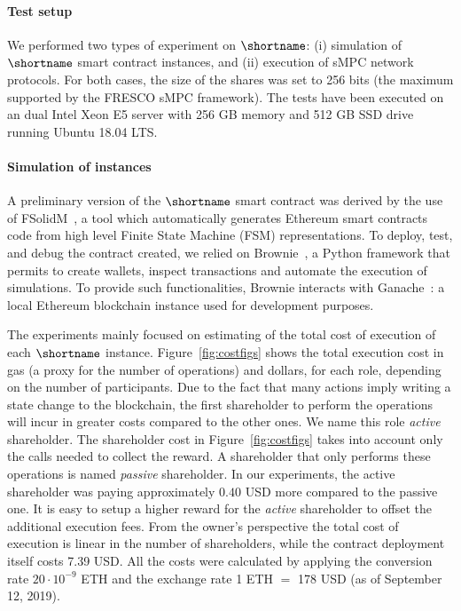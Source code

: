 \paragraph*{Test setup}
We performed two types of experiment on $\shortname$: (i) simulation of $\shortname$ smart contract instances, and (ii) execution of sMPC network protocols. 
For both cases, the size of the shares was set to 256 bits (the maximum supported by the FRESCO sMPC framework).
The tests have been executed on an dual Intel Xeon E5 server with 256 GB memory and 512 GB SSD drive running Ubuntu 18.04 LTS.

\medskip

\paragraph*{Simulation of \shortname instances}
A preliminary version of the $\shortname$ smart contract was derived by the use of FSolidM~\cite{Mavridou2017DesigningSE}, a tool which automatically generates Ethereum smart contracts code from high level Finite State Machine (FSM) representations.
To deploy, test, and debug the contract created, we relied on Brownie~\cite{brownie}, a Python framework that permits to create wallets, inspect transactions and automate the execution of simulations.
To provide such functionalities, Brownie interacts with Ganache~\cite{ganache}: a local Ethereum blockchain instance used for development purposes.

The experiments mainly focused on estimating of the total cost of execution of each $\shortname$ instance. 
Figure~\ref{fig:costfigs} shows the total execution cost in gas (a proxy for the number of operations) and dollars, for each role, depending on the number of participants.
%
Due to the fact that many \shortname actions imply writing a state change to the blockchain, the first shareholder to perform the operations will incur in greater costs compared to the other ones. We name this role {\em active} shareholder.
The shareholder cost in Figure~\ref{fig:costfigs} takes into account only the calls needed to collect the reward. A shareholder that only performs these operations is named {\em passive} shareholder.
In our experiments, the active shareholder was paying approximately $0.40$ USD more compared to the passive one.
It is easy to setup a higher reward for the {\em active} shareholder to offset the additional execution fees.
From the owner's perspective the total cost of execution is linear in the number of shareholders, while the contract deployment itself costs 7.39 USD.
All the costs were calculated by applying the conversion rate {$20 \cdot 10^{-9}$ ETH} and the exchange rate {1 ETH $=$ 178 USD} (as of September 12, 2019).

